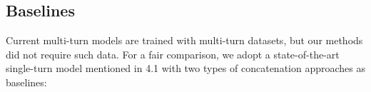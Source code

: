 





\subsection{Baselines}
Current multi-turn models are trained with multi-turn datasets, but our methods did not require such data. For a fair comparison, we adopt a state-of-the-art single-turn model mentioned in 4.1 with two types of concatenation approaches as baselines:
